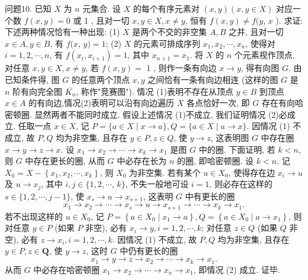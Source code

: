 问题10. 已知 $X$ 为 $n$ 元集合.
设 $X$ 的每个有序元素对 $(x, y)(x, y \in X)$ 对应一个数 $f(x, y)=0$ 或 1 , 且对一切 $x, y \in X, x \neq y$, 恒有 $f(x, y) \neq f(y$, $x$ ). 求证:下述两种情况恰有一种出现:
(1) $X$ 是两个不交的非空集 $A, B$ 之并, 且对一切 $x \in A, y \in B$, 有 $f(x$, $y)=1$;
(2) $X$ 的元素可排成序列 $x_1, x_2, \cdots, x_n$, 使得对 $i=1,2, \cdots, n$, 有 $f\left(x_i, x_{i+1}\right)=1$, 其中 $x_{n+1}=x_1$.
将 $X$ 的 $n$ 个元素视作顶点, 对任意 $x, y \in X, x \neq y$, 若 $f(x, y)=$ 1 , 则作一条有向边 $x \rightarrow y$, 得有向图 $G$. 由已知条件得, 图 $G$ 的任意两个顶点 $x, y$ 之间恰有一条有向边相连 (这样的图 $G$ 是 $n$ 阶有向完全图 $\overline{K_n}$, 称作"竞赛图").
情况 (1)表明不存在从顶点 $y \in B$ 到顶点 $x \in A$ 的有向边,情况(2)表明可以沿有向边遍历 $X$ 各点恰好一次, 即 $G$ 存在有向哈密顿圈.
显然两者不能同时成立.
假设上述情况 (1)不成立, 我们证明情况 (2)必成立.
任取一点 $x \in X$, 记 $P=\{a \in X \mid x \rightarrow a\}, Q=\{a \in X \mid a \rightarrow x\}$. 因情况 (1) 不成立, 故 $P, Q$ 均为非空集, 且存在 $y \in P, z \in Q$, 使 $y \rightarrow z$, 这表明图 $G$ 中存在圈 $x \rightarrow y \rightarrow z \rightarrow x$.
设 $x_1 \rightarrow x_2 \rightarrow \cdots \rightarrow x_k \rightarrow x_1$ 是图 $G$ 中的圈.
下面证明, 若 $k<n$, 则 $G$ 中存在更长的圈, 从而 $G$ 中必存在长为 $n$ 的圈, 即哈密顿圈.
设 $k<n$. 记 $X_0=X-\left\{x_1, x_2, \cdots, x_k\right\}$, 则 $X_0$ 为非空集.
若有某个 $u \in X_0$, 使得存在边 $x_i \rightarrow u$ 及 $u \rightarrow x_j$, 其中 $i, j \in\{1,2, \cdots$, $k\}$, 不失一般地可设 $i=1$, 则必存在这样的 $s \in\{1,2, \cdots, j-1\}$, 使 $x_s \rightarrow u \rightarrow x_{s+1}$, 这表明 $G$ 中有更长的圈
$$
x_1 \rightarrow x_2 \rightarrow \cdots \rightarrow x_s \rightarrow u \rightarrow x_{s+1} \rightarrow \cdots \rightarrow x_k \rightarrow x_1 .
$$
若不出现这样的 $u \in X_0$, 记 $P=\left\{a \in X_0 \mid x_1 \rightarrow a\right\}, Q=\left\{a \in X_0 \mid a \rightarrow\right. \left.x_1\right\}$, 则对任意 $y \in P$ (如果 $P$ 非空), 必有 $x_i \rightarrow y, i=1,2, \cdots, k$; 对任意 $z \in Q$ (如果 $Q$ 非空), 必有 $z \rightarrow x_i, i=1,2, \cdots, k$. 因情况 (1) 不成立, 故 $P, Q$ 均为非空集, 且存在 $y \in P, z \in \mathbf{Q}$, 使 $y \rightarrow z$, 这时 $G$ 中仍有更长的圈
$$
x_1 \rightarrow y \rightarrow z \rightarrow x_2 \rightarrow \cdots \rightarrow x_k \rightarrow x_1 .
$$
从而 $G$ 中必存在哈密顿圈 $x_1 \rightarrow x_2 \rightarrow \cdots \rightarrow x_n \rightarrow x_1$, 即情况 (2) 成立.
证毕.


